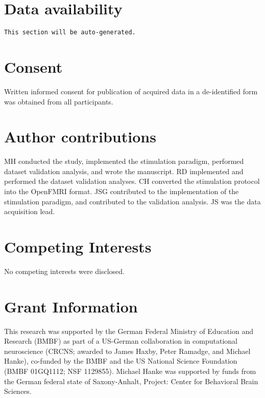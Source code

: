 \section*{Data availability}

\texttt{This section will be auto-generated.}


\section*{Consent}

Written informed consent for publication of acquired data in a de-identified
form was obtained from all participants.

\section*{Author contributions}

MH conducted the study, implemented the stimulation paradigm, performed dataset validation analysis, and wrote the manuscript.
RD implemented and performed the dataset validation analyses.
CH converted the stimulation protocol into the OpenFMRI format.
JSG contributed to the implementation of the stimulation paradigm, and contributed to the validation analysis.
JS was the data acquisition lead.

\section*{Competing Interests}
No competing interests were disclosed.

\section*{Grant Information}

This research was supported by the German Federal Ministry of Education and
Research (BMBF) as part of a US-German collaboration in computational
neuroscience (CRCNS; awarded to James Haxby, Peter Ramadge, and Michael Hanke),
co-funded by the BMBF and the US National Science Foundation (BMBF 01GQ1112;
NSF 1129855). Michael Hanke was supported by funds from the German federal
state of Saxony-Anhalt, Project: Center for Behavioral Brain Sciences.

